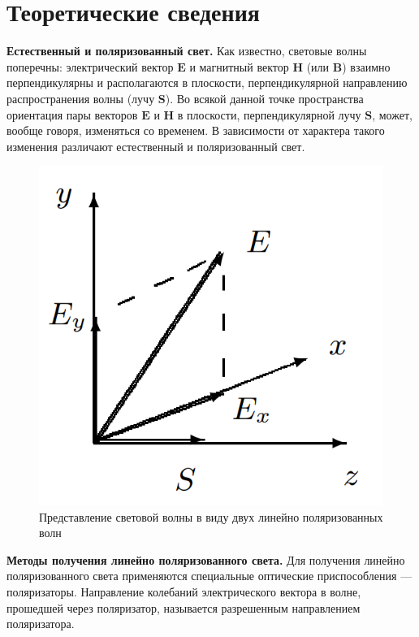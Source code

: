\documentclass[a4paper,12pt]{article} %
\begin{document}
	\section*{Теоретические сведения}
	\textbf{Естественный и поляризованный свет.} Как известно, световые волны поперечны: электрический вектор $\boldsymbol{E}$ и магнитный вектор $\boldsymbol{H}$ (или $\boldsymbol{B}$) взаимно перпендикулярны и располагаются в плоскости, перпендикулярной направлению распространения волны (лучу $\boldsymbol{S}$). Во всякой данной	точке пространства ориентация пары векторов $\boldsymbol{E}$ и $\boldsymbol{H}$ в плоскости, перпендикулярной лучу $\boldsymbol{S}$, может, вообще говоря, изменяться со временем. В зависимости от характера такого изменения различают естественный и поляризованный свет.
	\begin{figure}[h!]
		\centering
		\includegraphics[scale=0.7]{Pictures/Decompose}
		\caption{Представление световой волны в виду двух линейно поляризованных волн}
	\end{figure}
	
	
	\textbf{Методы получения линейно поляризованного света.} Для получения линейно поляризованного света применяются специальные оптические приспособления — поляризаторы. Направление колебаний электрического вектора в волне, прошедшей через поляризатор, называется разрешенным направлением поляризатора. 
	
\end{document}
